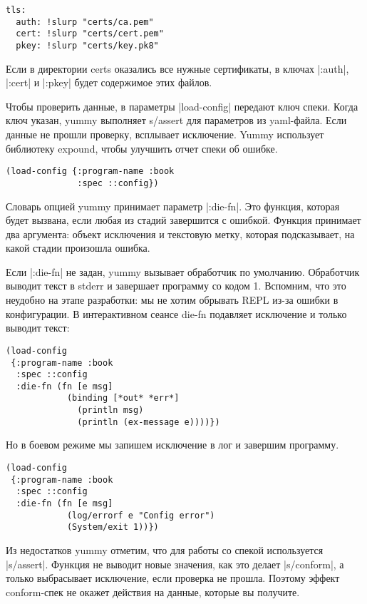 \begin{verbatim}
tls:
  auth: !slurp "certs/ca.pem"
  cert: !slurp "certs/cert.pem"
  pkey: !slurp "certs/key.pk8"
\end{verbatim}

Если в директории certs оказались все нужные сертификаты, в ключах \spverb|:auth|,
\spverb|:cert| и \spverb|:pkey| будет содержимое этих файлов.

Чтобы проверить данные, в параметры \spverb|load-config| передают ключ спеки. Когда
ключ указан, yummy выполняет s/assert для параметров из yaml-файла. Если данные
не прошли проверку, всплывает исключение. Yummy использует библиотеку expound,
чтобы улучшить отчет спеки об ошибке.

\begin{verbatim}
(load-config {:program-name :book
              :spec ::config})
\end{verbatim}

Словарь опцией yummy принимает параметр \spverb|:die-fn|. Это функция, которая будет
вызвана, если любая из стадий завершится с ошибкой. Функция принимает два
аргумента: объект исключения и текстовую метку, которая подсказывает, на какой
стадии произошла ошибка.

Если \spverb|:die-fn| не задан, yummy вызывает обработчик по умолчанию. Обработчик
выводит текст в stderr и завершает программу со кодом 1. Вспомним, что это
неудобно на этапе разработки: мы не хотим обрывать REPL из-за ошибки в
конфигурации. В интерактивном сеансе die-fn подавляет исключение и только
выводит текст:

\begin{verbatim}
(load-config
 {:program-name :book
  :spec ::config
  :die-fn (fn [e msg]
            (binding [*out* *err*]
              (println msg)
              (println (ex-message e))))})
\end{verbatim}

Но в боевом режиме мы запишем исключение в лог и завершим программу.

\begin{verbatim}
(load-config
 {:program-name :book
  :spec ::config
  :die-fn (fn [e msg]
            (log/errorf e "Config error")
            (System/exit 1))})
\end{verbatim}

Из недостатков yummy отметим, что для работы со спекой используется
\spverb|s/assert|. Функция не выводит новые значения, как это делает
\spverb|s/conform|, а только выбрасывает исключение, если проверка не
прошла. Поэтому эффект conform-спек не окажет действия на данные, которые вы
получите.

